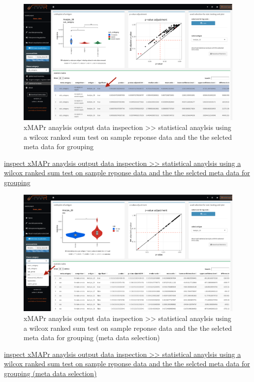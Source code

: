 \documentclass[]{book}
\theoremstyle{definition}
\theoremstyle{definition}
\theoremstyle{definition}
\theoremstyle{remark}
\begin{document}
\begin{figure}
\includegraphics[width=49.08in]{figures/statistical_analysis} \caption{xMAPr anaylsis output data inspection >> statistical anaylsis using a wilcox ranked sum test on sample reponse data and the the selcted meta data for grouping}\label{fig:ResponseStats}
\end{figure}

\href{figures/statistical_analysis.png}{inspect xMAPr anaylsis output
data inspection \textgreater{}\textgreater{} statistical anaylsis using
a wilcox ranked sum test on sample reponse data and the the selcted meta
data for grouping}

\begin{figure}
\includegraphics[width=49.03in]{figures/statistical_analysis1} \caption{xMAPr anaylsis output data inspection >> statistical anaylsis using a wilcox ranked sum test on sample reponse data and the the selcted meta data for grouping (meta data selection)}\label{fig:ResponseStats1}
\end{figure}

\href{figures/statistical_analysis1.png}{inspect xMAPr anaylsis output
data inspection \textgreater{}\textgreater{} statistical anaylsis using
a wilcox ranked sum test on sample reponse data and the the selcted meta
data for grouping (meta data selection)}
\end{document}
